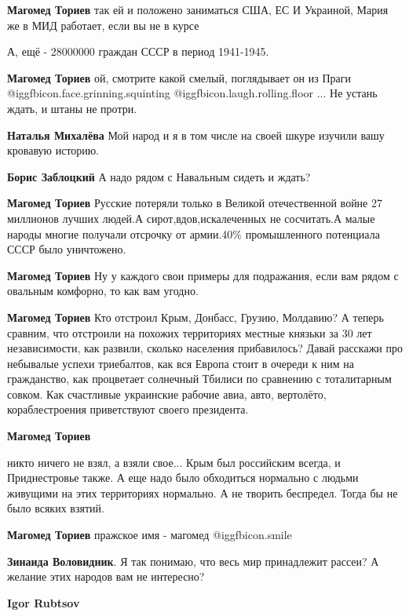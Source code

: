 \begin{itemize}
\begin{itemize}
\textbf{Магомед Ториев} так ей и положено заниматься США, ЕС И Украиной, Мария же в МИД работает, если вы не в курсе

А, ещё - 28000000 граждан СССР в период 1941-1945.

\textbf{Магомед Ториев} ой, смотрите какой смелый, поглядывает он из Праги  @igg{fbicon.face.grinning.squinting}  @igg{fbicon.laugh.rolling.floor}  ... Не устань ждать, и штаны не протри.

\textbf{Наталья Михалёва} Мой народ и я в том числе на своей шкуре изучили вашу кровавую историю.

\textbf{Борис Заблоцкий} А надо рядом с Навальным сидеть и ждать?

\textbf{Магомед Ториев} Русские потеряли только в Великой отечественной войне 27 миллионов лучших людей.А сирот,вдов,искалеченных не сосчитать.А
малые народы многие получали отсрочку от армии.40\% промышленного потенциала СССР было уничтожено.

\textbf{Магомед Ториев} Ну у каждого свои примеры для подражания, если вам рядом с овальным комфорно, то как вам угодно.

\textbf{Магомед Ториев}
Кто отстроил Крым, Донбасс, Грузию, Молдавию?
А теперь сравним, что отстроили на похожих территориях местные князьки за 30 лет независимости, как развили, сколько населения прибавилось?
Давай расскажи про небывалые успехи триебалтов, как вся Европа стоит в очереди к ним на гражданство, как процветает солнечный Тбилиси по сравнению с тоталитарным совком.
Как счастливые украинские рабочие авиа, авто, вертолёто, кораблестроения приветствуют своего президента.

\textbf{Магомед Ториев} 

никто ничего не взял, а взяли свое... Крым был российским всегда, и
Приднестровье также. А еще надо было обходиться нормально с людьми живущими на
этих территориях нормально. А не творить беспредел. Тогда бы не было всяких
взятий.


\textbf{Магомед Ториев} пражское имя - магомед  @igg{fbicon.smile} 

\textbf{Зинаида Воловидник}. Я так понимаю, что весь мир принадлежит рассеи? А желание этих народов вам не интересно?

\textbf{Igor Rubtsov} 


\end{itemize}
\end{itemize}
